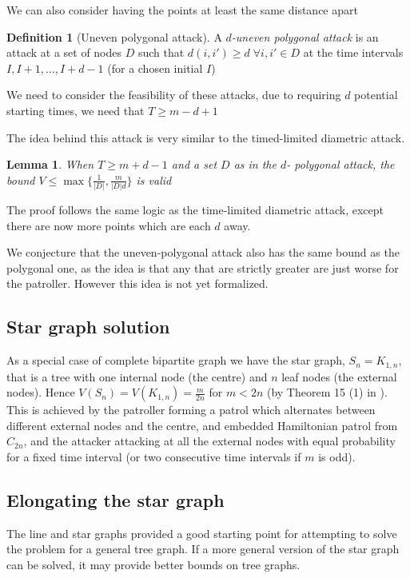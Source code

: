 \documentclass[a4paper,10pt]{article}
\newtheorem{lemma}[theorem]{Lemma}
\theoremstyle{definition}
\newtheorem{definition}[theorem]{Definition}
\theoremstyle{definition}
\theoremstyle{remark}
\theoremstyle{definition}
\begin{document}
We can also consider having the points at least the same distance apart

\begin{definition}[Uneven polygonal attack]
A \textit{$d$-uneven polygonal attack} is an attack at a set of nodes $D$ such that $d(i,i') \geq d \; \forall i,i' \in D$ at the time intervals $I,I+1,...,I+d-1$ (for a chosen initial $I$)
\end{definition}

We need to consider the feasibility of these attacks, due to requiring $d$ potential starting times, we need that $T \geq m-d+1$

The idea behind this attack is very similar to the timed-limited diametric attack.

\begin{lemma}
When $T \geq m+d-1$ and a set $D$ as in the $d$- polygonal attack, the bound $V \leq \max \{ \frac{1}{|D|} , \frac{m}{|D|d} \}$ is valid
\end{lemma}

The proof follows the same logic as the time-limited diametric attack, except there are now more points which are each $d$ away.

We conjecture that the uneven-polygonal attack also has the same bound as the polygonal one, as the idea is that any that are strictly greater are just worse for the patroller. However this idea is not yet formalized.


\subsection{Star graph solution}
As a special case of complete bipartite graph we have the star graph, $S_{n}=K_{1,n}$, that is a tree with one internal node (the centre) and $n$ leaf nodes (the external nodes). Hence $V(S_{n})=V(K_{1,n})=\frac{m}{2n}$ for $m<2n$ (by Theorem 15 (1) in \cite{Lin2013}). This is achieved by the patroller forming a patrol which alternates between different  external nodes and the centre, and embedded Hamiltonian patrol from $C_{2n}$, and the attacker attacking at all the external nodes with equal probability for a fixed time interval (or two consecutive time intervals if $m$ is odd).

\subsection{Elongating the star graph}
The line and star graphs provided a good starting point for attempting to solve the problem for a general tree graph. If a more general version of the star graph can be solved, it may provide better bounds on tree graphs. 
\end{document}
